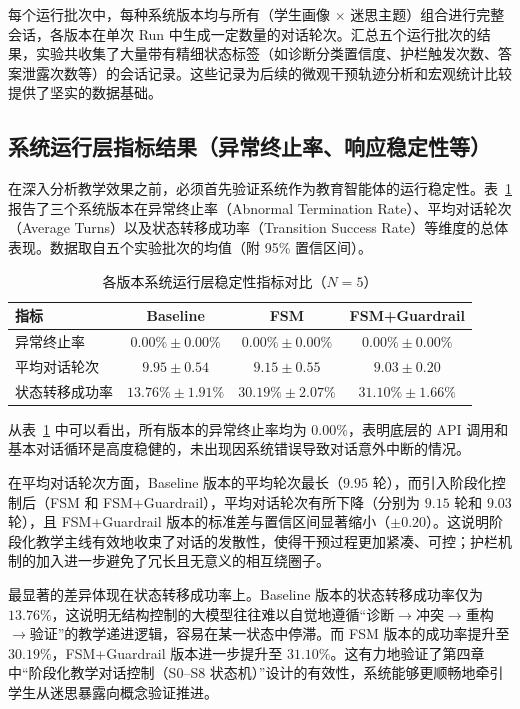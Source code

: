 每个运行批次中，每种系统版本均与所有（学生画像 $\times$ 迷思主题）组合进行完整会话，各版本在单次 Run 中生成一定数量的对话轮次。汇总五个运行批次的结果，实验共收集了大量带有精细状态标签（如诊断分类置信度、护栏触发次数、答案泄露次数等）的会话记录。这些记录为后续的微观干预轨迹分析和宏观统计比较提供了坚实的数据基础。

\subsection{系统运行层指标结果（异常终止率、响应稳定性等）}
\label{subsec:5.1.2}

在深入分析教学效果之前，必须首先验证系统作为教育智能体的运行稳定性。表~\ref{tab:system-stability} 报告了三个系统版本在异常终止率（Abnormal Termination Rate）、平均对话轮次（Average Turns）以及状态转移成功率（Transition Success Rate）等维度的总体表现。数据取自五个实验批次的均值（附 95\% 置信区间）。

\begin{table}[htbp]
    \centering
    \caption{各版本系统运行层稳定性指标对比（$N=5$）}
    \label{tab:system-stability}
    \begin{tabular}{lccc}
        \hline
        \textbf{指标} & \textbf{Baseline} & \textbf{FSM} & \textbf{FSM+Guardrail} \\
        \hline
        异常终止率 & $0.00\% \pm 0.00\%$ & $0.00\% \pm 0.00\%$ & $0.00\% \pm 0.00\%$ \\
        平均对话轮次 & $9.95 \pm 0.54$ & $9.15 \pm 0.55$ & $9.03 \pm 0.20$ \\
        状态转移成功率 & $13.76\% \pm 1.91\%$ & $30.19\% \pm 2.07\%$ & $31.10\% \pm 1.66\%$ \\
        \hline
    \end{tabular}
\end{table}

从表~\ref{tab:system-stability} 中可以看出，所有版本的异常终止率均为 0.00\%，表明底层的 API 调用和基本对话循环是高度稳健的，未出现因系统错误导致对话意外中断的情况。

在平均对话轮次方面，Baseline 版本的平均轮次最长（$9.95$ 轮），而引入阶段化控制后（FSM 和 FSM+Guardrail），平均对话轮次有所下降（分别为 $9.15$ 轮和 $9.03$ 轮），且 FSM+Guardrail 版本的标准差与置信区间显著缩小（$\pm 0.20$）。这说明阶段化教学主线有效地收束了对话的发散性，使得干预过程更加紧凑、可控；护栏机制的加入进一步避免了冗长且无意义的相互绕圈子。

最显著的差异体现在状态转移成功率上。Baseline 版本的状态转移成功率仅为 $13.76\%$，这说明无结构控制的大模型往往难以自觉地遵循“诊断$\rightarrow$冲突$\rightarrow$重构$\rightarrow$验证”的教学递进逻辑，容易在某一状态中停滞。而 FSM 版本的成功率提升至 $30.19\%$，FSM+Guardrail 版本进一步提升至 $31.10\%$。这有力地验证了第四章中“阶段化教学对话控制（S0--S8 状态机）”设计的有效性，系统能够更顺畅地牵引学生从迷思暴露向概念验证推进。

